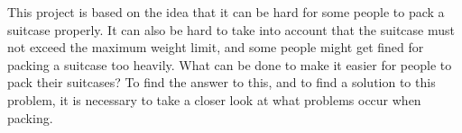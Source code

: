 This project is based on the idea that it can be hard for some people to pack a suitcase properly. It can also be hard to take into account that the suitcase must not exceed the maximum weight limit, and some people might get fined for packing a suitcase too heavily. What can be done to make it easier for people to pack their suitcases? To find the answer to this, and to find a solution to this problem, it is necessary to take a closer look at what problems occur when packing.